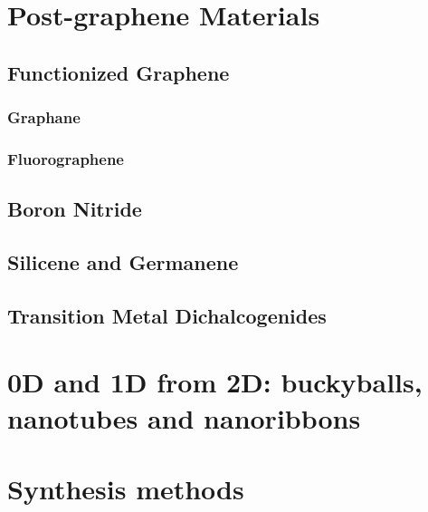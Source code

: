  
\section{Post-graphene Materials}
\subsection{Functionized Graphene}
\subsubsection{Graphane}
\subsubsection{Fluorographene}
\subsection{Boron Nitride}
\subsection{Silicene and Germanene}
\subsection{Transition Metal Dichalcogenides}
\section{0D and 1D from 2D: buckyballs, nanotubes and nanoribbons}
\section{Synthesis methods}
